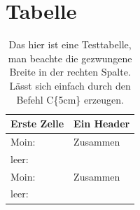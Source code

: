 \documentclass[
12pt, %
toc=listofnumbered, %
toc=chapterentrydotfill, %
numbers=noenddot, %
captions=tableheading, %
]{scrreprt}
\let\Oldsection\section
\renewcommand{\section}{\FloatBarrier\Oldsection}
\begin{document}
\section{Tabelle}
\begin{table}[ht]
	\centering
	\caption{Das hier ist eine Testtabelle, man beachte die gezwungene Breite in der rechten Spalte. Lässt sich einfach durch den Befehl C\{5cm\} erzeugen.}
	\begin{tabular}{|l|C{5cm}|}
		\hline
		\textbf{Erste Zelle}&\textbf{Ein Header}\\
		\hline
		Moin: & Zusammen\\\hline
		leer:&\\\hline
		Moin: & Zusammen\\\hline
		leer:&\\\hline
	\end{tabular}
\label{tab:testtabelle}
\end{table}
\end{document}
